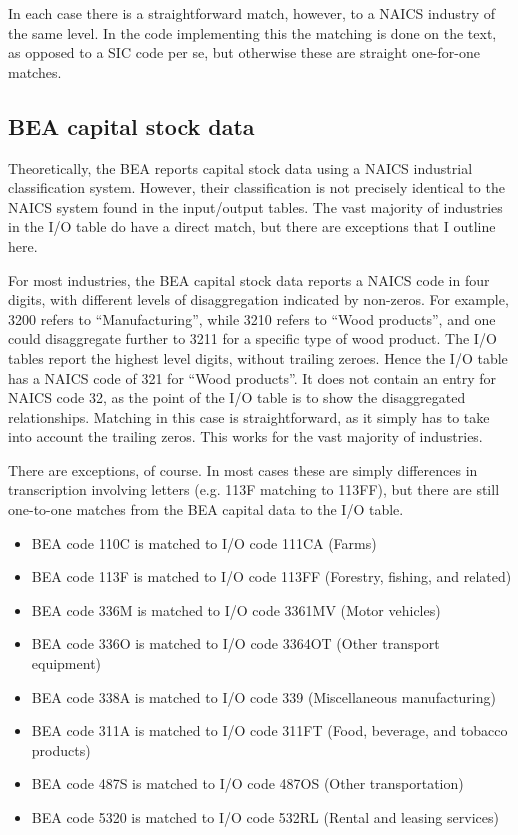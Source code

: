 \documentclass[11pt]{article}
\begin{document}
In each case there is a straightforward match, however, to a NAICS industry of the same level. In the code implementing this the matching is done on the text, as opposed to a SIC code per se, but otherwise these are straight one-for-one matches.

\subsection{BEA capital stock data}
Theoretically, the BEA reports capital stock data using a NAICS industrial classification system. However, their classification is not precisely identical to the NAICS system found in the input/output tables. The vast majority of industries in the I/O table do have a direct match, but there are exceptions that I outline here. 

For most industries, the BEA capital stock data reports a NAICS code in four digits, with different levels of disaggregation indicated by non-zeros. For example, 3200 refers to ``Manufacturing'', while 3210 refers to ``Wood products'', and one could disaggregate further to 3211 for a specific type of wood product. The I/O tables report the highest level digits, without trailing zeroes. Hence the I/O table has a NAICS code of 321 for ``Wood products''. It does not contain an entry for NAICS code 32, as the point of the I/O table is to show the disaggregated relationships. Matching in this case is straightforward, as it simply has to take into account the trailing zeros. This works for the vast majority of industries. 

There are exceptions, of course. In most cases these are simply differences in transcription involving letters (e.g. 113F matching to 113FF), but there are still one-to-one matches from the BEA capital data to the I/O table.

\begin{itemize}
	\item BEA code 110C is matched to I/O code 111CA (Farms)
	\item BEA code 113F is matched to I/O code 113FF (Forestry, fishing, and related)
	\item BEA code 336M is matched to I/O code 3361MV (Motor vehicles)
	\item BEA code 336O is matched to I/O code 3364OT (Other transport equipment)
	\item BEA code 338A is matched to I/O code 339 (Miscellaneous manufacturing)
	\item BEA code 311A is matched to I/O code 311FT (Food, beverage, and tobacco products)
	\item BEA code 487S is matched to I/O code 487OS (Other transportation)
	\item BEA code 5320 is matched to I/O code 532RL (Rental and leasing services)
\end{itemize}
\end{document}
